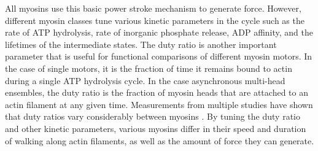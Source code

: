\documentclass{ucetd}
\begin{document}
All myosins use this basic power stroke mechanism to generate force.  However, different myosin classes tune various kinetic parameters in the cycle such as the rate of ATP hydrolysis, rate of inorganic phosphate release, ADP affinity, and the lifetimes of the intermediate states.  The duty ratio is another important parameter that is useful for functional comparisons of different myosin motors.  In the case of single motors, it is the fraction of time it remains bound to actin during a single ATP hydrolysis cycle.  In the case asynchronous multi-head ensembles, the duty ratio is the fraction of myosin heads that are attached to an actin filament at any given time.  Measurements from multiple studies have shown that duty ratios vary considerably between myosins \cite{OConnell:2007hb}.  By tuning the duty ratio and other kinetic parameters, various myosins differ in their speed and duration of walking along actin filaments, as well as the amount of force they can generate.

\end{document}
